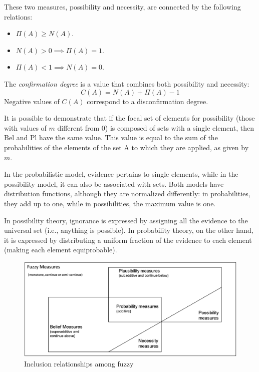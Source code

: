 These two measures, possibility and necessity, are connected by the following relations:
\begin{itemize}
    \item $\Pi(A) \geq N(A)$.
    \item $N(A) > 0 \implies \Pi(A)=1$.
    \item $\Pi(A) < 1 \implies N(A)=0$.
\end{itemize}
\begin{definition}
    The \emph{confirmation degree} is a value that combines both possibility and necessity:
    \[C(A)=N(A)+\Pi(A)-1\]
    Negative values of $C(A)$ correspond to a disconfirmation degree.
\end{definition}
It is possible to demonstrate that if the focal set of elements for possibility (those with values of $m$ different from $0$) is composed of sets with a single element, then Bel and Pl have the same value. 
This value is equal to the sum of the probabilities of the elements of the set A to which they are applied, as given by $m$.

In the probabilistic model, evidence pertains to single elements, while in the possibility model, it can also be associated with sets. 
Both models have distribution functions, although they are normalized differently: in probabilities, they add up to one, while in possibilities, the maximum value is one.

In possibility theory, ignorance is expressed by assigning all the evidence to the universal set (i.e., anything is possible). 
In probability theory, on the other hand, it is expressed by distributing a uniform fraction of the evidence to each element (making each element equiprobable).
\begin{figure}[H]
    \centering
    \includegraphics[width=0.75\linewidth]{images/measures.png}
    \caption{Inclusion relationships among fuzzy}
\end{figure}